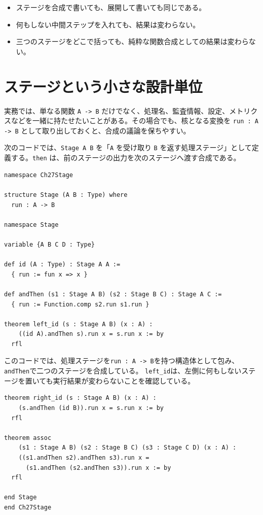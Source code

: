 \begin{itemize}
\item ステージを合成で書いても、展開して書いても同じである。
\item 何もしない中間ステップを入れても、結果は変わらない。
\item 三つのステージをどこで括っても、純粋な関数合成としての結果は変わらない。
\end{itemize}

\section{ステージという小さな設計単位}

実務では、単なる関数 \texttt{A -> B} だけでなく、処理名、監査情報、設定、メトリクスなどを一緒に持たせたいことがある。その場合でも、核となる変換を \texttt{run : A -> B} として取り出しておくと、合成の議論を保ちやすい。

次のコードでは、\texttt{Stage A B} を「\texttt{A} を受け取り \texttt{B} を返す処理ステージ」として定義する。\texttt{then} は、前のステージの出力を次のステージへ渡す合成である。

\begin{listing}[htbp]
\begin{verbatim}
namespace Ch27Stage

structure Stage (A B : Type) where
  run : A -> B

namespace Stage

variable {A B C D : Type}

def id (A : Type) : Stage A A :=
  { run := fun x => x }

def andThen (s1 : Stage A B) (s2 : Stage B C) : Stage A C :=
  { run := Function.comp s2.run s1.run }

theorem left_id (s : Stage A B) (x : A) :
    ((id A).andThen s).run x = s.run x := by
  rfl
\end{verbatim}
\caption{処理ステージの合成}
\label{lst:ch27-stage}
\end{listing}

このコードでは、処理ステージを\texttt{run : A -> B}を持つ構造体として包み、\texttt{andThen}で二つのステージを合成している。
\texttt{left\_id}は、左側に何もしないステージを置いても実行結果が変わらないことを確認している。

\begin{listing}[htbp]
\begin{verbatim}
theorem right_id (s : Stage A B) (x : A) :
    (s.andThen (id B)).run x = s.run x := by
  rfl

theorem assoc
    (s1 : Stage A B) (s2 : Stage B C) (s3 : Stage C D) (x : A) :
    ((s1.andThen s2).andThen s3).run x =
      (s1.andThen (s2.andThen s3)).run x := by
  rfl

end Stage
end Ch27Stage
\end{verbatim}
\caption{ステージ合成の右恒等律と結合律}
\label{lst:ch27-stage-laws}
\end{listing}

